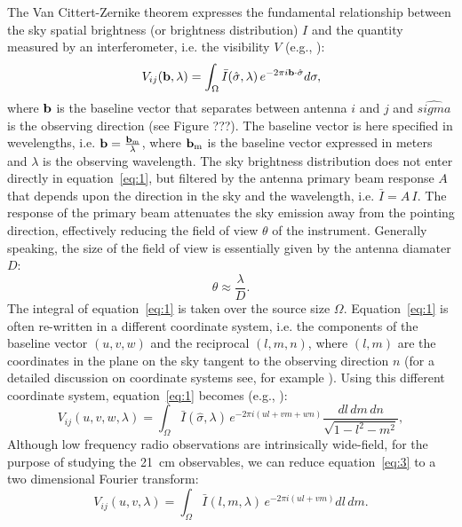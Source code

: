 The Van Cittert-Zernike theorem expresses the fundamental relationship between the sky spatial brightness (or brightness distribution) $I$ and the quantity measured by an interferometer, i.e. the visibility $V$ (e.g., \cite{TMS}):
\begin{equation}
V_{ij} ({\bf b}, \lambda) = \int_\Omega {\bar I} (\hat{\sigma}, \lambda) \, e^{-2 \pi i {\bf b} \cdot {\hat \sigma}} d {\bf \sigma},
\label{eq:1}
\end{equation}
where ${\bf b}$ is the baseline vector that separates between antenna $i$ and $j$ and $\hat{sigma}$ is the observing direction (see Figure ???). The baseline vector is here specified in wevelengths, i.e. ${\bf b} = \frac{{\bf b_{\rm m}}}{\lambda}$, where ${\bf b_{\rm m}}$ is the baseline vector expressed in meters and $\lambda$ is the observing wavelength.
The sky brightness distribution does not enter directly in equation~\ref{eq:1}, but filtered by the antenna primary beam response $A$ that depends upon the direction in the sky and the wavelength, i.e. ${\bar I} = A  \, I$. The response of the primary beam attenuates the sky emission away from the pointing direction, effectively reducing the field of view $\theta$ of the instrument. Generally speaking, the size of the field of view is essentially given by the antenna diamater $D$: 
\begin{equation}
\theta \approx \frac{\lambda}{D}.
\label{eq:2}
\end{equation}
The integral of equation~\ref{eq:1} is taken over the source size $\Omega$. Equation~\ref{eq:1} is often re-written in a different coordinate system, i.e. the components of the baseline vector $(u,v,w)$ and the reciprocal $(l,m,n)$, where $(l,m)$ are the coordinates in the plane on the sky tangent to the observing direction $n$ (for a detailed discussion on coordinate systems see, for example \cite{TMS}). Using this different coordinate system, equation~\ref{eq:1} becomes (e.g., \cite{TMS}):
\begin{equation}
V_{ij} (u,v,w, \lambda) = \int_\Omega {\bar I} (\hat{\sigma}, \lambda) \, e^{-2 \pi i (ul + vm + wn)} \frac {dl \, dm \, dn}{\sqrt{1 - l^2 - m^2}},
\label{eq:3}
\end{equation}
Although low frequency radio observations are intrinsically wide-field, for the purpose of studying the 21~cm observables, we can reduce equation~\ref{eq:3} to a two dimensional Fourier transform:
\begin{equation}
V_{ij} (u,v, \lambda) = \int_\Omega {\bar I} (l, m, \lambda) \, e^{-2 \pi i (ul + vm)} dl \, dm.
\label{eq:4}
\end{equation}
